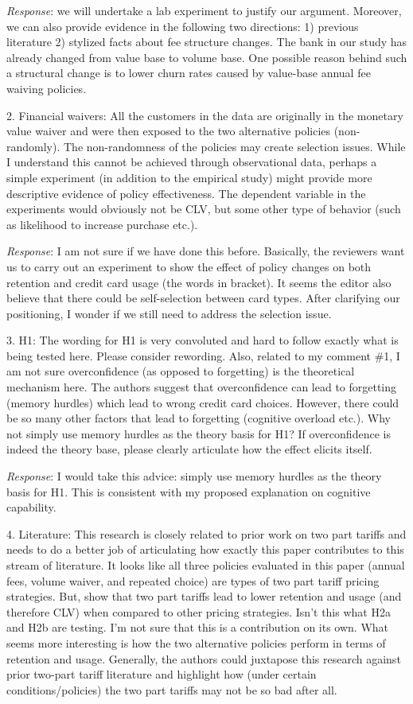 \documentclass[titlepage,12pt,letterpaper]{article}
\numberwithin{equation}{section}
\begin{document}
\emph{Response}: we will undertake a lab experiment to justify our argument. Moreover, we can also provide evidence in the following two directions: 1) previous literature 2) stylized facts about fee structure changes. The bank in our study has already changed from value base to volume base. One possible reason behind such a structural change is to lower churn rates caused by value-base annual fee waiving policies.  

2.	Financial waivers: All the customers in the data are originally in the monetary value waiver and were then exposed to the two alternative policies (non-randomly). The non-randomness of the policies may create selection issues. While I understand this cannot be achieved through observational data, perhaps a simple experiment (in addition to the empirical study) might provide more descriptive evidence of policy effectiveness. The dependent variable in the experiments would obviously not be CLV, but some other type of behavior (such as likelihood to increase purchase etc.).

\emph{Response}: I am not sure if we have done this before. Basically, the reviewers want us to carry out an experiment to show the effect of policy changes on both retention and credit card usage (the words in bracket). It seems the editor also believe that there could be self-selection between card types. After clarifying our positioning, I wonder if we still need to address the selection issue. 

3.	H1: The wording for H1 is very convoluted and hard to follow exactly what is being tested here. Please consider rewording.
Also, related to my comment \#1, I am not sure overconfidence (as opposed to forgetting) is the theoretical mechanism here. The authors suggest that overconfidence can lead to forgetting (memory hurdles) which lead to wrong credit card choices. However, there could be so many other factors that lead to forgetting (cognitive overload etc.). Why not simply use memory hurdles as the theory basis for H1? If overconfidence is indeed the theory base, please clearly articulate how the effect elicits itself.

\emph{Response}: I would take this advice:  simply use memory hurdles as the theory basis for H1. This is consistent with my proposed explanation on cognitive capability. 

4.	Literature: This research is closely related to prior work on two part tariffs \citep{Ascarza2012,Iyengar2011} and needs to do a better job of articulating how exactly this paper contributes to this stream of literature. It looks like all three policies evaluated in this paper (annual fees, volume waiver, and repeated choice) are types of two part tariff pricing strategies. But, \cite{Iyengar2011} show that two part tariffs lead to lower retention and usage (and therefore CLV) when compared to other pricing strategies. Isn't this what H2a and H2b are testing. I'm not sure that this is a contribution on its own. What seems more interesting is how the two alternative policies perform in terms of retention and usage. Generally, the authors could juxtapose this research against prior two-part tariff literature and highlight how (under certain conditions/policies) the two part tariffs may not be so bad after all.
\end{document}
